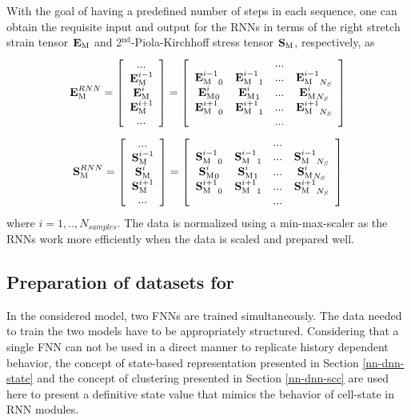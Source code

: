With the goal of having a predefined number of steps in each sequence, one can obtain the requisite input and output for the RNNs in terms of the right stretch strain tensor $ \tgm[]{E} $ and 2$ ^\text{nd} $-Piola-Kirchhoff stress tensor $ \tgm[]{S} $, respectively, as
\begin{eqnarray}\label{eq-nn-data5}
\tgm[]{E}^{RNN}=
\left[\begin{array}{c}
...\\\tgm[]{E}^{i-1}\\\tgm[]{E}^i\\\tgm[]{E}^{i+1}\\...
\end{array}\right]
=
\left[\begin{array}{c c c c}
& & ... & \\
{\tgm[]{E}^{i-1}}_0 & {\tgm[]{E}^{i-1}}_1 & ... & {\tgm[]{E}^{i-1}}_{N_S}\\
{\tgm[]{E}^{i}}_0 & {\tgm[]{E}^{i}}_1 & ... & {\tgm[]{E}^{i}}_{N_S}\\
{\tgm[]{E}^{i+1}}_0 & {\tgm[]{E}^{i+1}}_1 & ... & {\tgm[]{E}^{i+1}}_{N_S}\\
& & ... &
\end{array}\right]
\end{eqnarray}
\begin{eqnarray}\label{eq-nn-data6}
\tgm[]{S}^{RNN}=
\left[\begin{array}{c}
...\\\tgm[]{S}^{i-1}\\\tgm[]{S}^i\\\tgm[]{S}^{i+1}\\...
\end{array}\right]
=
\left[\begin{array}{c c c c}
& & ... & \\
{\tgm[]{S}^{i-1}}_0 & {\tgm[]{S}^{i-1}}_1 & ... & {\tgm[]{S}^{i-1}}_{N_S}\\
{\tgm[]{S}^{i}}_0 & {\tgm[]{S}^{i}}_1 & ... & {\tgm[]{S}^{i}}_{N_S}\\
{\tgm[]{S}^{i+1}}_0 & {\tgm[]{S}^{i+1}}_1 & ... & {\tgm[]{S}^{i+1}}_{N_S}\\
& & ... &
\end{array}\right]
\end{eqnarray}
where $ i=1,..,N_{samples} $. The data is normalized using a min-max-scaler as the RNNs work more efficiently when the data is scaled and prepared well.

\subsection{Preparation of datasets for \fnn}
In the considered \fnn model, two FNNs are trained simultaneously. The data needed to train the two models have to be appropriately structured. Considering that a single FNN can not be used in a direct manner to replicate history dependent behavior, the concept of state-based representation presented in Section \ref{nn-dnn-state} and the concept of clustering presented in Section \ref{nn-dnn-scc} are used here to present a definitive state value that mimics the behavior of cell-state in RNN modules.

